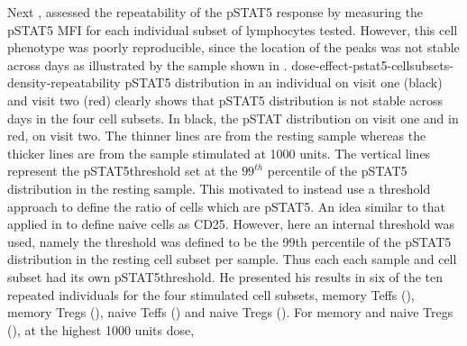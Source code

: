 Next , assessed the repeatability of the pSTAT5 response by measuring the pSTAT5 \gls{MFI}
for each individual subset of lymphocytes tested.
However, this cell phenotype was poorly reproducible, since the location of the peaks was not stable across days as illustrated
by the sample shown in .
{dose-effect-pstat5-cellsubsets-density-repeatability}
{ pSTAT5 distribution in an individual on visit one (black) and visit two (red) clearly shows that pSTAT5 distribution is not stable across days in the four cell
subsets. }
{
In black, the pSTAT distribution on visit one and in red, on visit two.
The thinner lines are from the resting sample whereas the thicker lines are from the sample stimulated at 1000 units.
The vertical lines represent the pSTAT5\positive threshold set at the $99^{th}$ percentile of the pSTAT5 distribution in the resting sample.
}
This motivated  to instead use a threshold approach to define the ratio of cells which are pSTAT5\positive.
An idea similar to that applied in  to define naive cells as CD25\positive.
However, here an internal threshold was used, namely
the threshold was defined to be the 99th percentile of the pSTAT5 distribution in the resting cell subset per sample.
Thus each each sample and cell subset had its own pSTAT5\positive threshold.
He presented his results in six of the ten repeated individuals for the four stimulated cell subsets,
memory Teffs (),
memory Tregs (),
naive Teffs ()
and naive Tregs ().
For memory and naive Tregs (), at the highest 1000 units dose,
